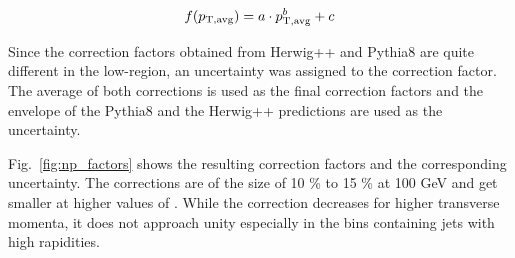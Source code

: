 \begin{equation}
  f(p_{\mathrm{T,avg}}) = a \cdot p_{\mathrm{T,avg}}^b + c
  \label{fcn:np_fit}
\end{equation}

Since the correction factors obtained from Herwig++ and Pythia8 are quite
different in the low-\pt region, an uncertainty was assigned to the correction
factor. The average of both corrections is used as the final correction factors
and the envelope of the Pythia8 and the Herwig++ predictions are used as the
uncertainty.

Fig.~\ref{fig:np_factors} shows the resulting correction factors and the
corresponding uncertainty.  The corrections are of the size of 10 \% to 15 \% at
100 \si{GeV} and get smaller at higher values of \ptavg. While the correction
decreases for higher transverse momenta, it does not approach unity especially
in the bins containing jets with high rapidities. 

